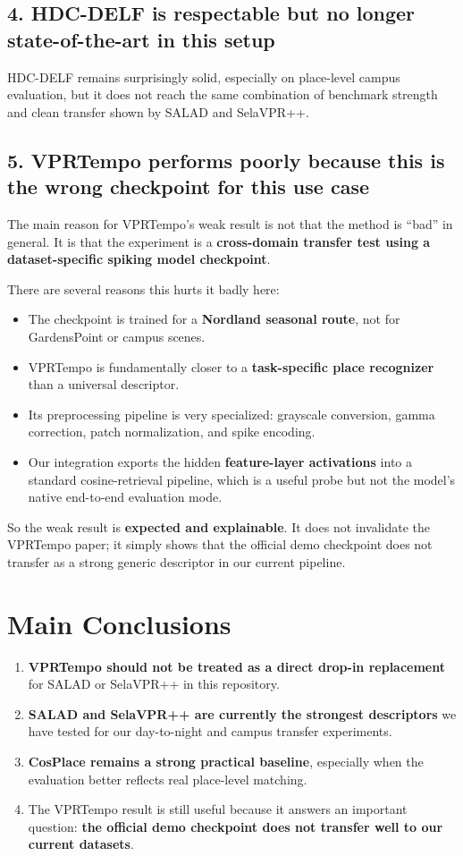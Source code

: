 \documentclass[11pt]{article}
\begin{document}
\subsection*{4. HDC-DELF is respectable but no longer state-of-the-art in this setup}
HDC-DELF remains surprisingly solid, especially on place-level campus evaluation, but it does not reach the same combination of benchmark strength and clean transfer shown by SALAD and SelaVPR++.

\subsection*{5. VPRTempo performs poorly because this is the wrong checkpoint for this use case}
The main reason for VPRTempo's weak result is not that the method is ``bad'' in general. It is that the experiment is a \textbf{cross-domain transfer test using a dataset-specific spiking model checkpoint}.

There are several reasons this hurts it badly here:
\begin{itemize}[leftmargin=*]
  \item The checkpoint is trained for a \textbf{Nordland seasonal route}, not for GardensPoint or campus scenes.
  \item VPRTempo is fundamentally closer to a \textbf{task-specific place recognizer} than a universal descriptor.
  \item Its preprocessing pipeline is very specialized: grayscale conversion, gamma correction, patch normalization, and spike encoding.
  \item Our integration exports the hidden \textbf{feature-layer activations} into a standard cosine-retrieval pipeline, which is a useful probe but not the model's native end-to-end evaluation mode.
\end{itemize}

So the weak result is \textbf{expected and explainable}. It does not invalidate the VPRTempo paper; it simply shows that the official demo checkpoint does not transfer as a strong generic descriptor in our current pipeline.

\section*{Main Conclusions}
\begin{enumerate}[leftmargin=*]
  \item \textbf{VPRTempo should not be treated as a direct drop-in replacement} for SALAD or SelaVPR++ in this repository.
  \item \textbf{SALAD and SelaVPR++ are currently the strongest descriptors} we have tested for our day-to-night and campus transfer experiments.
  \item \textbf{CosPlace remains a strong practical baseline}, especially when the evaluation better reflects real place-level matching.
  \item The VPRTempo result is still useful because it answers an important question: \textbf{the official demo checkpoint does not transfer well to our current datasets}.
\end{enumerate}
\end{document}
